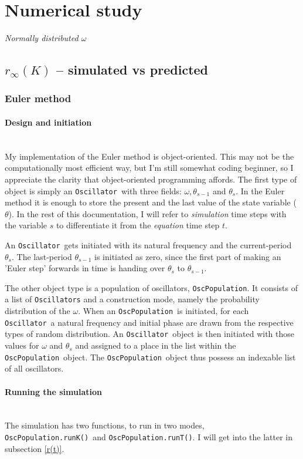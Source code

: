 \documentclass[11pt,a4paper]{article}
\newcommand{\osc}{\texttt{Oscillator}~}
\newcommand{\oscpop}{\texttt{OscPopulation}~}
\newcommand{\code}[1]{\texttt{#1}}
\newcommand{\para}[1]{\paragraph{#1}\mbox{}\\}
\begin{document}
\section{Numerical study}

{\Large\textit{Normally distributed $\omega$}}
\subsection{$r_{\infty}(K)$ -- simulated vs predicted}


\subsubsection{Euler method}
\para{Design and initiation}
My implementation of the Euler method is object-oriented. 
This may not be the computationally most efficient way, but I'm still somewhat coding beginner, so I appreciate the clarity that object-oriented programming affords.
The first type of object is simply an \osc with three fields: $\omega, \theta_{s-1}$ and $\theta_s$. 
In the Euler method it is enough to store the present and the last value of the state variable ($\theta$).
In the rest of this documentation, I will refer to \textit{simulation} time steps with the variable $s$ to differentiate it from the \textit{equation} time step $t$.

An \osc gets initiated with its natural frequency and the current-period $\theta_s$. 
The last-period $\theta_{s-1}$ is initiated as zero, since the first part of making an 'Euler step' forwards in time is handing over $\theta_{s}$ to $\theta_{s-1}$. 

The other object type is a population of oscillators, \code{OscPopulation}. 
It consists of a list of \code{Oscillators} and a construction mode, namely the probability distribution of the $\omega$.
When an \oscpop is initiated, for each \osc a natural frequency and initial phase are drawn from the respective types of random distribution. 
An \osc object is then initiated with those values for $\omega$ and $\theta_s$ and assigned to a place in the list within the \oscpop object.
The \oscpop object thus possess an indexable list of all oscillators.







\para{Running the simulation}
The simulation has two functions, to run in two modes, \code{OscPopulation.runK()}~and \linebreak \code{OscPopulation.runT()}. 
I will get into the latter in subsection \ref{r(t)}.
\end{document}
